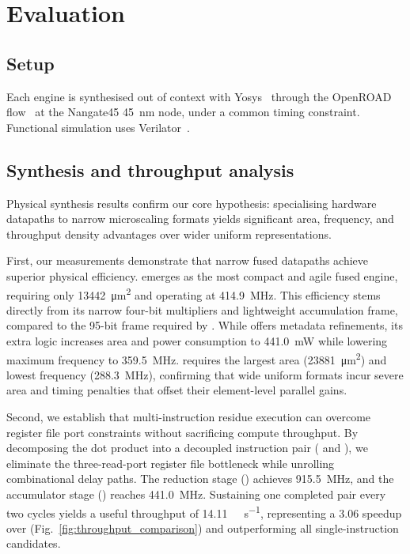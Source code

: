 \section{Evaluation}
\label{sec:eval}

\subsection{Setup}
\label{sec:eval-setup}

Each engine is synthesised out of context with Yosys~\cite{wolf_yosys} through
the OpenROAD flow~\cite{ajayi2019openroad} at the Nangate45
\SI{45}{\nano\meter} node, under a common timing constraint.
Functional simulation uses Verilator~\cite{snyder_verilator}.

\subsection{Synthesis and throughput analysis}
\label{sec:eval-synthesis}

Physical synthesis results confirm our core hypothesis: specialising hardware datapaths to narrow microscaling formats yields significant area, frequency, and throughput density advantages over wider uniform representations.

First, our measurements demonstrate that narrow fused datapaths achieve superior physical efficiency. \fpfour{} emerges as the most compact and agile fused engine, requiring only \SI{13442}{\micro\meter\squared} and operating at \SI{414.9}{\mega\hertz}. This efficiency stems directly from its narrow four-bit multipliers and lightweight accumulation frame, compared to the 95-bit frame required by \fpeight. While \mtwo{} offers metadata refinements, its extra logic increases area and power consumption to \SI{441.0}{\milli\watt} while lowering maximum frequency to \SI{359.5}{\mega\hertz}. \fpeight{} requires the largest area (\SI{23881}{\micro\meter\squared}) and lowest frequency (\SI{288.3}{\mega\hertz}), confirming that wide uniform formats incur severe area and timing penalties that offset their element-level parallel gains.

Second, we establish that multi-instruction residue execution can overcome register file port constraints without sacrificing compute throughput. By decomposing the \fpfourres{} dot product into a decoupled instruction pair ( and ), we eliminate the three-read-port register file bottleneck while unrolling combinational delay paths. The reduction stage () achieves \SI{915.5}{\mega\hertz}, and the accumulator stage () reaches \SI{441.0}{\mega\hertz}. Sustaining one completed pair every two cycles yields a useful throughput of \SI{14.11}{\giga\flop\per\second}, representing a \SI{3.06}{\times} speedup over \fpeight{} (Fig.~\ref{fig:throughput_comparison}) and outperforming all single-instruction candidates.



